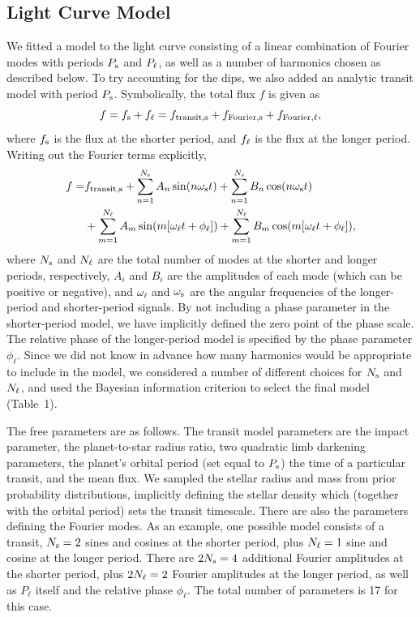 \documentclass[12pt,twocolumn,tighten,trackchanges]{aastex62}
\begin{document}
\subsection{Light Curve Model}

We fitted a model to the light curve consisting of a linear
combination of Fourier modes with periods $P_{\rm s}$ and $P_{\rm
\ell}$, as well as a number of harmonics chosen as described below. To
try accounting for the dips, we also added an analytic transit model
with period $P_{\rm s}$.  Symbolically, the total flux $f$ is given as
\begin{equation}
  f = f_{\rm s} + f_{\rm \ell}
  = f_{\rm transit,s} + f_{\rm Fourier,s} + f_{\rm Fourier,\ell},
\end{equation}
where $f_{\rm s}$ is the flux at the shorter period, and $f_{\rm
\ell}$ is the flux at the longer period.  Writing out the Fourier
terms explicitly,
\begin{align}
  f = &f_{\rm transit,s} + \sum_{n=1}^{N_{\rm s}} A_n \sin(n\omega_{\rm s}t)
  + \sum_{n=1}^{N_{\rm s}} B_n \cos(n\omega_{\rm s}t)\\
  &+ \sum_{m=1}^{N_{\rm \ell}} A_m \sin(m[\omega_{\rm \ell}t+\phi_{\rm \ell}])
  + \sum_{m=1}^{N_{\rm \ell}} B_m \cos(m[\omega_{\rm \ell}t+\phi_{\rm \ell}]), \nonumber
\end{align}
where $N_{\rm s}$ and $N_{\rm \ell}$ are the total number of modes at
the shorter and longer periods, respectively, $A_i$ and $B_i$ are the
amplitudes of each mode (which can be positive or negative), and
$\omega_\ell$ and $\omega_{\rm s}$ are the angular frequencies of the
longer-period and shorter-period signals. By not including a phase
parameter in the shorter-period model, we have implicitly defined the
zero point of the phase scale. The relative phase of the longer-period
model is specified by the phase parameter $\phi_\ell$.  Since we did
not know in advance how many harmonics would be appropriate to include
in the model, we considered a number of different choices for $N_{\rm
s}$ and $N_{\rm \ell}$, and used the Bayesian information criterion to
select the final model (Table~1).

The free parameters are as follows.  The transit model parameters are
the impact parameter, the planet-to-star radius ratio, two quadratic
limb darkening parameters, the planet's orbital period (set equal to
$P_{\rm s}$) the time of a particular transit, and the mean flux.  We
sampled the stellar radius and mass from prior probability
distributions, implicitly defining the stellar density which (together
with the orbital period) sets the transit timescale.  There are also
the parameters defining the Fourier modes.  As an example, one
possible model consists of a transit, $N_{\rm s}=2$ sines and cosines
at the shorter period, plus $N_{\rm \ell}=1$ sine and cosine at the
longer period.  There are $2N_{\rm s}=4$ additional Fourier amplitudes
at the shorter period, plus $2N_{\rm \ell}=2$ Fourier amplitudes at
the longer period, as well as $P_\ell$ itself and the relative phase
$\phi_\ell$.  The total number of parameters is 17 for this case.
\end{document}

